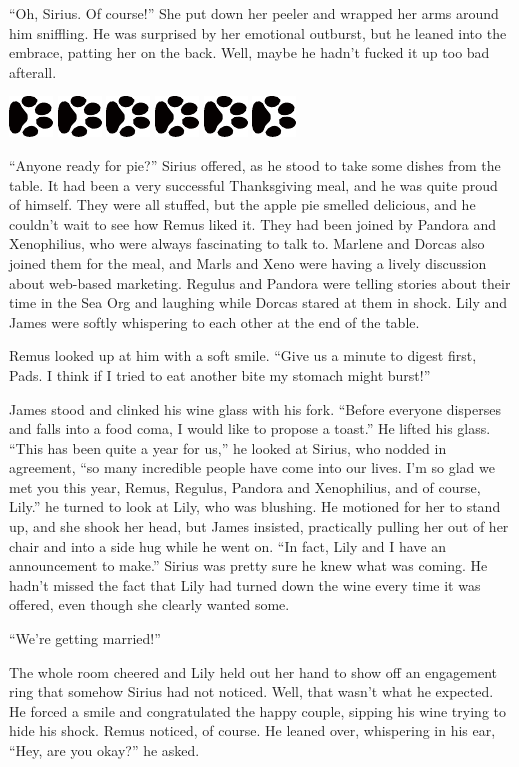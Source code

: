 \documentclass[12pt,twoside,openright]{memoir}
\newcommand{\dogPrintRule}{	
	\begin{center}
		\hspace{.5em}
		\includegraphics[angle=60]{dogprint.pdf}
		\hspace{.5em}
		\includegraphics[angle=120]{dogprint.pdf}
		\hspace{.5em}
		\includegraphics[angle=60]{dogprint.pdf}
		\hspace{.5em}
		\includegraphics[angle=120]{dogprint.pdf}
		\hspace{.5em}
		\includegraphics[angle=60]{dogprint.pdf}
		\hspace{.5em}
		\includegraphics[angle=120]{dogprint.pdf}
		\hspace{.5em}
	\end{center}
}
\begin{document}
``Oh, Sirius. Of course!'' She put down her peeler and wrapped her arms around him sniffling. He was surprised by her emotional outburst, but he leaned into the embrace, patting her on the back. Well, maybe he hadn't fucked it up too bad afterall.

\dogPrintRule

``Anyone ready for pie?'' Sirius offered, as he stood to take some dishes from the table. It had been a very successful Thanksgiving meal, and he was quite proud of himself. They were all stuffed, but the apple pie smelled delicious, and he couldn't wait to see how Remus liked it. They had been joined by Pandora and Xenophilius, who were always fascinating to talk to. Marlene and Dorcas also joined them for the meal, and Marls and Xeno were having a lively discussion about web-based marketing. Regulus and Pandora were telling stories about their time in the Sea Org and laughing while Dorcas stared at them in shock. Lily and James were softly whispering to each other at the end of the table.

Remus looked up at him with a soft smile. ``Give us a minute to digest first, Pads. I think if I tried to eat another bite my stomach might burst!''

James stood and clinked his wine glass with his fork. ``Before everyone disperses and falls into a food coma, I would like to propose a toast.'' He lifted his glass. ``This has been quite a year for us,'' he looked at Sirius, who nodded in agreement, ``so many incredible people have come into our lives. I'm so glad we met you this year, Remus, Regulus, Pandora and Xenophilius, and of course, Lily.'' he turned to look at Lily, who was blushing. He motioned for her to stand up, and she shook her head, but James insisted, practically pulling her out of her chair and into a side hug while he went on. ``In fact, Lily and I have an announcement to make.'' Sirius was pretty sure he knew what was coming. He hadn't missed the fact that Lily had turned down the wine every time it was offered, even though she clearly wanted some. 

``We're getting married!'' 

The whole room cheered and Lily held out her hand to show off an engagement ring that somehow Sirius had not noticed. Well, that wasn't what he expected. He forced a smile and congratulated the happy couple, sipping his wine trying to hide his shock. Remus noticed, of course. He leaned over, whispering in his ear, ``Hey, are you okay?'' he asked.
\end{document}
